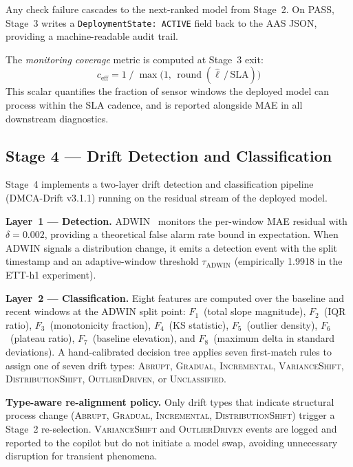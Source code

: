 \documentclass[12pt,a4paper]{article}
\begin{document}
Any check failure cascades to the next-ranked model from Stage~2.
On PASS, Stage~3 writes a \texttt{DeploymentState: ACTIVE} field
back to the AAS JSON, providing a machine-readable audit trail.

The \emph{monitoring coverage} metric is computed at Stage~3 exit:
\begin{equation}
  c_\text{eff} = 1 \;/\; \max\!\bigl(1,\,
    \operatorname{round}(\hat{\ell}\,/\,\text{SLA})\bigr)
  \label{eq:coverage}
\end{equation}
This scalar quantifies the fraction of sensor windows the deployed
model can process within the SLA cadence, and is reported alongside
MAE in all downstream diagnostics.

\subsection{Stage 4 — Drift Detection and Classification}
\label{subsec:s4}

Stage~4 implements a two-layer drift detection and classification
pipeline (DMCA-Drift v3.1.1) running on the residual stream
of the deployed model.

\textbf{Layer~1 --- Detection.}
ADWIN~\cite{Bifet2007ADWIN} monitors the per-window MAE residual
with $\delta = 0.002$, providing a theoretical false alarm rate bound
in expectation.
When ADWIN signals a distribution change, it emits a detection
event with the split timestamp and an adaptive-window threshold
$\tau_\text{ADWIN}$ (empirically 1.9918 in the ETT-h1 experiment).

\textbf{Layer~2 --- Classification.}
Eight features are computed over the baseline and recent windows at
the ADWIN split point:
$F_1$~(total slope magnitude), $F_2$~(IQR ratio), $F_3$~(monotonicity
fraction), $F_4$~(KS statistic), $F_5$~(outlier density),
$F_6$~(plateau ratio), $F_7$~(baseline elevation), and
$F_8$~(maximum delta in standard deviations).
A hand-calibrated decision tree applies seven first-match rules
to assign one of seven drift types:
\textsc{Abrupt}, \textsc{Gradual}, \textsc{Incremental},
\textsc{VarianceShift}, \textsc{DistributionShift},
\textsc{OutlierDriven}, or \textsc{Unclassified}.

\textbf{Type-aware re-alignment policy.}
Only drift types that indicate structural process change
(\textsc{Abrupt}, \textsc{Gradual}, \textsc{Incremental},
\textsc{DistributionShift}) trigger a Stage~2 re-selection.
\textsc{VarianceShift} and \textsc{OutlierDriven} events are
logged and reported to the copilot but do not initiate a model
swap, avoiding unnecessary disruption for transient phenomena.
\end{document}
